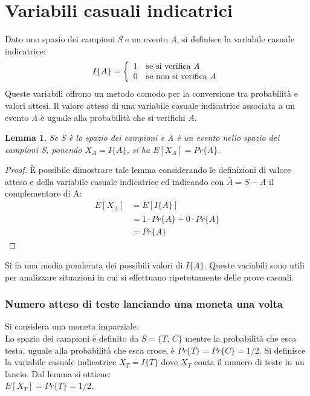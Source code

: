 \documentclass[10pt, a4paper]{report}
\newtheorem{lemma}{Lemma}[chapter]
\begin{document}
\section{Variabili casuali indicatrici}
Dato uno spazio dei campioni \textit{S} e un evento \textit{A}, si definisce la variabile casuale indicatrice:
\begin{equation*}
I\{A\} = \left\{
\begin{array}{ll}
1 & \text{se si verifica \textit{A}} \\
0 & \text{se non si verifica \textit{A}}
\end{array}\right.
\end{equation*}
Queste variabili offrono un metodo comodo per la conversione tra probabilità e valori attesi. Il valore atteso di una variabile casuale indicatrice associata a un evento \textit{A} è uguale alla probabilità che si verifichi \textit{A}.
\begin{lemma}
Se \textit{S} è lo spazio dei campioni e \textit{A} è un evento nello spazio dei campioni \textit{S}, ponendo $X_A = I\{A\}$, si ha $E[X_A] = Pr\{A\}$.
\end{lemma}
\begin{proof}
È possibile dimostrare tale lemma considerando le definizioni di valore atteso e della variabile casuale indicatrice ed indicando con $\overline{A} = S - A$ il complementare di A:
\begin{align*}
E[X_A] &= E[I\{A\}] \\
&= 1 \cdot Pr\{A\} + 0 \cdot Pr\{\overline{A}\} \\
&= Pr\{A\}
\end{align*}
\end{proof}
Si fa una media ponderata dei possibili valori di $I\{A\}$. Queste variabili sono utili per analizzare situazioni in cui si effettuano ripetutamente delle prove casuali.
\subsubsection{Numero atteso di teste lanciando una moneta una volta}
Si considera una moneta imparziale.\\Lo spazio dei campioni è definito da $S = \{ T,\,C\}$ mentre la probabilità che esca testa, uguale alla probabilità che esca croce, è $Pr\{T\} = Pr\{C\} = 1/2$. Si definisce la variabile casuale indicatrice $X_T = I\{T\}$ dove $X_T$ conta il numero di teste in un lancio. Dal lemma si ottiene:\\$E[X_T] = Pr\{T\} = 1/2$.
\end{document}
